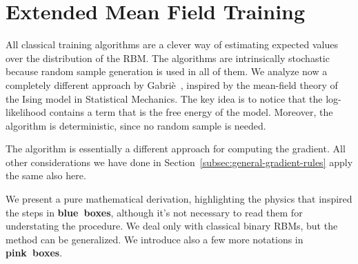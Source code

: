 
\section{Extended Mean Field Training}
All classical training algorithms are a clever way of estimating expected values
over the distribution of the RBM. The algorithms are intrinsically stochastic
because random sample generation is used in all of them. We analyze now a completely
different approach by Gabriè~\cite{gabrie18training}, inspired by the mean-field
theory of the Ising model in Statistical Mechanics. The key idea is to notice that the
log-likelihood contains a term that is the free energy of the model. Moreover, the
algorithm is deterministic, since no random sample is needed.

The algorithm is essentially a different approach for computing the gradient. All other
considerations we have done in Section~\ref{subsec:general-gradient-rules} apply the same
also here.

We present a pure mathematical derivation, highlighting the physics that inspired the
steps in {\bf \color{physics-blue}blue~boxes}, although it's not necessary to read them for
understating the procedure. We deal only with classical binary RBMs,
but the method can be generalized. We introduce also a few more notations in
{\bf \color{pink-notation}pink~boxes}.

\newcommand{\FEn}[2]{F{\left[#1;#2\right]}}
\newcommand{\Gam}[2]{\Gamma{\left[#1;#2\right]}}
\newcommand{\DistributionMean}[4]{\left\langle#1\right\rangle_{#4{\left[#2;#3\right]}}}
\newcommand{\Fmean}[3]{\DistributionMean{#1}{#2}{#3}{f}}
\newcommand{\Gmean}[3]{\DistributionMean{#1}{#2}{#3}{\gamma}}
\newcommand{\qhat}[1]{\vec{\hat{q}}{(#1)}}
\newcommand{\Lambd}[2]{\vec{\lambda}{\left[#1;#2\right]}}

\newcommand{\lgt}[2]{\lambda_t{\left[#1;#2\right]}}
\newcommand{\lvi}[2]{\lambda_i^v{\left[#1;#2\right]}}
\newcommand{\lhj}[2]{\lambda_j^h{\left[#1;#2\right]}}
\newcommand{\lgtz}[1]{\lgt{#1}{0}}
\newcommand{\lviz}[1]{\lvi{#1}{0}}
\newcommand{\lhjz}[1]{\lhj{#1}{0}}
\newcommand{\lgtm}[1]{\lgt{\vec{m}}{#1}}
\newcommand{\lvim}[1]{\lvi{\vec{m}}{#1}}
\newcommand{\lhjm}[1]{\lhj{\vec{m}}{#1}}
\newcommand{\lgtmz}{\lgt{\vec{m}}{0}}
\newcommand{\lvimz}{\lvi{i\vec{m}}{0}}
\newcommand{\lhjmz}{\lhj{\vec{m}}{0}}

